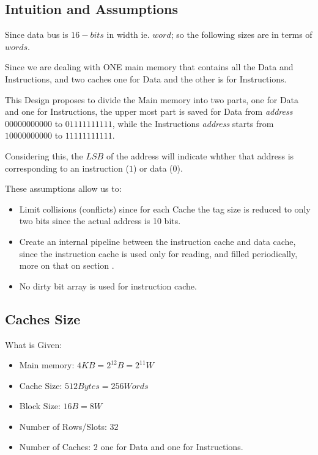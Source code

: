 \subsection{Intuition and Assumptions}
    Since data bus is $16-bits$ in width ie. $word$; so the following sizes are in terms of $words$.
    
    Since we are dealing with ONE main memory that contains all the Data and Instructions,
    and two caches one for Data and the other is for Instructions.

    This Design proposes to divide the Main memory into two parts, one for Data and one for Instructions,
    the upper most part is saved for Data from \textit{address} $00000000000$ to $01111111111$, while the Instructions
    \textit{address} starts from $10000000000$ to $11111111111$.

    Considering this, the $LSB$ of the address will indicate whther that address is corresponding to
    an instruction ($1$) or data ($0$).

    These assumptions allow us to:
    \begin{itemize}
        \item Limit collisions (conflicts) since for each Cache the tag size is reduced
            to only two bits since the actual address is 10 bits.
        \item Create an internal pipeline between the instruction cache and data cache,
            since the instruction cache is used only for reading, and filled periodically, more on 
            that on section .
        \item No dirty bit array is used for instruction cache.
    \end{itemize}
     
\subsection{Caches Size}
    What is Given:
    \begin{itemize}
        \item Main memory: $4KB = 2^{12}B =2^{11} W$
        \item Cache Size: $512 Bytes = 256Words$
        \item Block Size: $16B = 8W$
        \item Number of Rows/Slots: $32$
        \item Number of Caches: $2$ one for Data and one for Instructions.
    \end{itemize}

